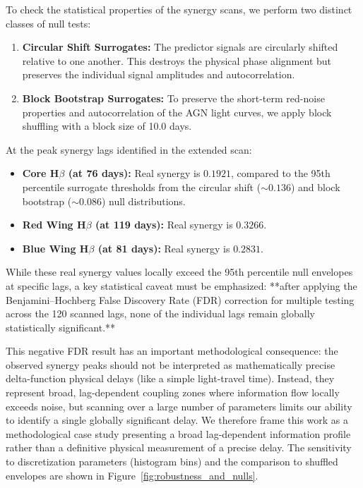 \documentclass[fleqn,usenatbib]{mnras}
\begin{document}
To check the statistical properties of the synergy scans, we perform two distinct classes of null tests:
\begin{enumerate}
\item \textbf{Circular Shift Surrogates:} The predictor signals are circularly shifted relative to one another. This destroys the physical phase alignment but preserves the individual signal amplitudes and autocorrelation.
\item \textbf{Block Bootstrap Surrogates:} To preserve the short-term red-noise properties and autocorrelation of the AGN light curves, we apply block shuffling with a block size of 10.0 days.
\end{enumerate}

At the peak synergy lags identified in the extended scan:
\begin{itemize}
\item \textbf{Core H\(\beta\) (at 76 days):} Real synergy is $0.1921$, compared to the 95th percentile surrogate thresholds from the circular shift ($\sim 0.136$) and block bootstrap ($\sim 0.086$) null distributions.
\item \textbf{Red Wing H\(\beta\) (at 119 days):} Real synergy is $0.3266$.
\item \textbf{Blue Wing H\(\beta\) (at 81 days):} Real synergy is $0.2831$.
\end{itemize}

While these real synergy values locally exceed the 95th percentile null envelopes at specific lags, a key statistical caveat must be emphasized: **after applying the Benjamini–Hochberg False Discovery Rate (FDR) correction for multiple testing across the 120 scanned lags, none of the individual lags remain globally statistically significant.** 

This negative FDR result has an important methodological consequence: the observed synergy peaks should not be interpreted as mathematically precise delta-function physical delays (like a simple light-travel time). Instead, they represent broad, lag-dependent coupling zones where information flow locally exceeds noise, but scanning over a large number of parameters limits our ability to identify a single globally significant delay. We therefore frame this work as a methodological case study presenting a broad lag-dependent information profile rather than a definitive physical measurement of a precise delay. The sensitivity to discretization parameters (histogram bins) and the comparison to shuffled envelopes are shown in Figure~\ref{fig:robustness_and_nulls}.
\end{document}

